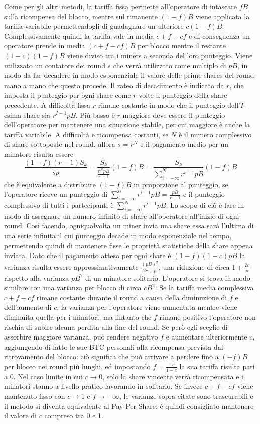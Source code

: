 Come per gli altri metodi, la tariffa fissa permette all'operatore di intascare $fB$ sulla ricompensa del blocco, mentre sul rimanente $(1-f)B$ viene applicata la tariffa variabile permettendogli di guadagnare un ulteriore $c(1-f)B$. Complessivamente quindi la tariffa vale in media $c + f -cf$ e di conseguenza un operatore prende in media $(c+f-cf)B$  per blocco mentre il restante $(1-c)(1-f)B$ viene diviso tra i miners a seconda del loro punteggio.
Viene utilizzato un contatore dei round $s$ che verrà utilizzato come multiplo di $pB$, in modo da far decadere in modo esponenziale il valore delle prime shares del round mano a mano che questo procede.
Il rateo di decadimento è indicato da $r$, che imposta il punteggio per ogni share come $r$ volte il punteggio della share precedente. A difficoltà fissa $r$ rimane costante in modo che il punteggio dell'$I$-esima share sia $r^{I-1}pB$. Più basso è $r$ maggiore deve essere il punteggio dell'operatore per mantenere una situazione stabile, per cui maggiore è anche la tariffa variabile.
A difficoltà e ricompensa costanti, se $N$ è il numero complessivo di share sottoposte nel round, allora $s=r^N$ e il pagamento medio per un minatore risulta essere
\[ \frac{(1-f)(r-1)S_k}{sp} = \frac{S_k}{\frac{r^N pB}{r-1}}(1-f)B = \frac{S_k}{\sum^N_{i=-\infty}r^{i-1}pB}(1-f)B \]
che è equivalente a distribuire $(1-f)B$ in proporzione al punteggio, se l'operatore riceve un punteggio di $\sum^0_{i=-\infty}r^{i-1}pB = \frac{pB}{r-1}$ e il punteggio complessivo di tutti i partecipanti è $\sum^N_{i=-\infty}r^{i-1}pB$.
Lo scopo di ciò è fare in modo di assegnare un numero infinito di share all'operatore all'inizio di ogni round. Così facendo, ogniqualvolta un miner invia una share essa sarà l'ultima di una serie infinita il cui punteggio decade in modo esponenziale nel tempo, permettendo quindi di mantenere fisse le proprietà statistiche della share appena inviata.
Dato che il pagamento atteso per ogni share è $(1-f)(1-c)pB$ la varianza risulta essere approssimativamente $\frac{(pB)^2}{2c+p}$, una riduzione di circa $1+\frac{2c}{p}$ rispetto alla varianza $pB^2$ di un minatore solitario. L'operatore si trova in modo similare con una varianza per blocco di circa $cB^2$.
Se la tariffa media complessiva $c+f-cf$ rimane costante durante il round a causa della diminuzione di $f$ e dell'aumento di $c$, la varianza per l'operatore viene aumentata mentre viene diminuita quella per i minatori, ma fintanto che $f$ rimane positivo l'operatore non rischia di subire alcuna perdita alla fine del round. Se però egli sceglie di assorbire maggiore varianza, può rendere negativo $f$ e aumentare ulteriormente $c$, aggiungendo di fatto le sue BTC personali alla ricompensa prevista dal ritrovamento del blocco: ciò significa che può arrivare a perdere fino a $(-f)B$ per blocco nei round più lunghi, ed impostando $f=\frac{-c}{1-c}$ la sua tariffa risulta pari a 0.
Nel caso limite in cui $c \rightarrow 0$, solo la share vincente verrà ricompensata e i minatori stanno a livello pratico lavorando in solitario.
Se invece $c+f-cf$ viene mantenuto fisso con $c \rightarrow 1$ e $f \rightarrow -\infty$, le varianze sopra citate sono trascurabili e il metodo si diventa equivalente al Pay-Per-Share: è quindi consigliato mantenere il valore di $c$ compreso tra 0 e 1.

